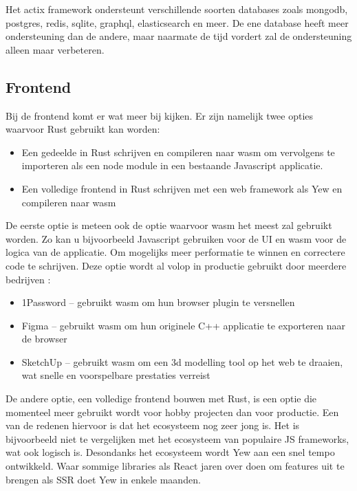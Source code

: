 Het actix framework ondersteunt verschillende soorten databases zoals mongodb, postgres, redis,
sqlite, graphql, elasticsearch en meer. De ene database heeft meer ondersteuning dan de andere, maar
naarmate de tijd vordert zal de ondersteuning alleen maar verbeteren. 

\subsection{Frontend}

Bij de frontend komt er wat meer bij kijken. Er zijn namelijk twee opties waarvoor Rust gebruikt kan
worden: 
\begin{itemize}
  \item Een gedeelde in Rust schrijven en compileren naar wasm om vervolgens te importeren als een node
    module in een bestaande Javascript applicatie. 
  \item Een volledige frontend in Rust schrijven met een web framework als Yew en compileren naar wasm 
\end{itemize}               

\clearpage

De eerste optie is meteen ook de optie waarvoor wasm het meest zal gebruikt worden. Zo kan u
bijvoorbeeld Javascript gebruiken voor de UI en wasm voor de logica van de applicatie. Om mogelijks
meer performatie te winnen en correctere code te schrijven. Deze optie wordt al volop in productie
gebruikt door meerdere bedrijven \cite{made_with_wasm}: 
\begin{itemize}
  \item 1Password – gebruikt wasm om hun browser plugin te versnellen 
  \item Figma – gebruikt wasm om hun originele C++ applicatie te exporteren naar de browser 
  \item SketchUp – gebruikt wasm om een 3d modelling tool op het web te draaien, wat snelle en
    voorspelbare prestaties verreist 
\end{itemize}

De andere optie, een volledige frontend bouwen met Rust, is een optie die momenteel meer gebruikt
wordt voor hobby projecten dan voor productie. Een van de redenen hiervoor is dat het ecosysteem nog
zeer jong is. Het is bijvoorbeeld niet te vergelijken met het ecosysteem van populaire JS
frameworks, wat ook logisch is. Desondanks het ecosysteem wordt Yew aan een snel tempo ontwikkeld.
Waar sommige libraries als React jaren over doen om features uit te brengen als SSR doet Yew in
enkele maanden.

